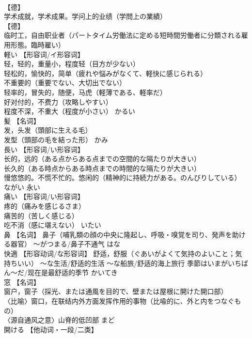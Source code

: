 \documentclass[8pt]{extreport}
\begin{document}
\begin{CJK}{UTF8}{min}
\\	【德】
\\	学术成就，学术成果。学问上的业绩（学問上の業績） 
\\	【德】
\\	临时工，自由职业者（パートタイム労働法に定める短時間労働者に分類される雇用形態。臨時雇い）		
\\	軽い	【形容词/イ形容词】 
\\	轻，轻的，重量小，程度轻（目方が少ない） 
\\	轻松的，愉快的，简单（疲れや悩みがなくて、軽快に感じられる） 
\\	不重要的（重要でない、大切出でない） 
\\	轻率的，冒失的，随便，马虎（軽薄である、軽率だ） 
\\	好对付的，不费力（攻略しやすい） 
\\	程度不深，不重大（程度が小さい）	かるい	
\\	髪	【名词】 
\\	发，头发（頭部に生える毛） 
\\	发型（頭部の毛を結った形）	かみ	
\\	長い	【形容词/い形容词】 
\\	长的，远的（ある点からある点までの空間的な隔たりが大きい） 
\\	长久的（ある時点からある時点までの時間的な隔たりが大きい） 
\\	慢悠悠的。不慌不忙的。悠闲的（精神的に持続力がある。のんびりしている）	ながい	永い
\\	痛い	【形容词/い形容词】 
\\	疼的（痛みを感じるさま） 
\\	痛苦的（苦しく感じる） 
\\	吃不消（感に堪えない）	いたい	
\\	鼻	【名词】 鼻子（哺乳類の顔の中央に隆起し、呼吸・嗅覚を司り、発声を助ける器官） ～がつまる/鼻子不通气	はな	
\\	快適	【形容动词/な形容词】 舒适，舒服（ぐあいがよくて気持のよいこと；気持ちいい） 〜な生活/舒适的生活 〜な船旅/舒适的海上旅行 季節はいまがいちばん〜だ/现在是最舒适的季节	かいてき	
\\	窓	【名词】 
\\	窗户，窗子（採光、または通風を目的で、壁または屋根に開けた開口部） 
\\	〈比喻〉窗口，在联结内外方面发挥作用的事物（比喩的に、外と内をつなぐもの） 
\\	〈源自通风之意〉山脊的低凹部	まど	
\\	開ける	【他动词・一段/二类】 

\end{CJK}
\end{document}
